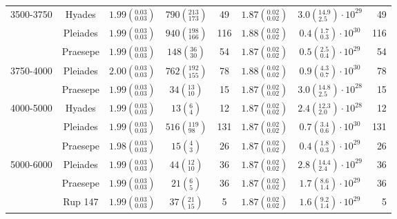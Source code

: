 \begin{tabular}{lccccccr}
3500-3750 & Hyades &  $1.99\left(^{0.03}_{0.03}\right)$ &     $790\left(^{213}_{173}\right)$ &             49 &  $1.87\left(^{0.02}_{0.02}\right)$ &  $3.0\left(^{14.9}_{2.5}\right)\cdot 10^{29}$ &               49 \\
          & Pleiades &  $1.99\left(^{0.03}_{0.03}\right)$ &     $940\left(^{198}_{166}\right)$ &            116 &  $1.88\left(^{0.02}_{0.02}\right)$ &   $0.4\left(^{1.7}_{0.3}\right)\cdot 10^{30}$ &              116 \\
          & Praesepe &  $1.99\left(^{0.03}_{0.03}\right)$ &       $148\left(^{36}_{30}\right)$ &             54 &  $1.87\left(^{0.02}_{0.02}\right)$ &   $0.5\left(^{2.5}_{0.4}\right)\cdot 10^{29}$ &               54 \\
3750-4000 & Pleiades &  $2.00\left(^{0.03}_{0.03}\right)$ &     $762\left(^{192}_{155}\right)$ &             78 &  $1.88\left(^{0.02}_{0.02}\right)$ &   $0.9\left(^{4.3}_{0.7}\right)\cdot 10^{30}$ &               78 \\
          & Praesepe &  $1.99\left(^{0.03}_{0.03}\right)$ &        $34\left(^{13}_{10}\right)$ &             15 &  $1.87\left(^{0.02}_{0.02}\right)$ &  $3.0\left(^{14.8}_{2.5}\right)\cdot 10^{28}$ &               15 \\
4000-5000 & Hyades &  $1.99\left(^{0.03}_{0.03}\right)$ &          $13\left(^{6}_{4}\right)$ &             12 &  $1.87\left(^{0.02}_{0.02}\right)$ &  $2.4\left(^{12.3}_{2.0}\right)\cdot 10^{28}$ &               12 \\
          & Pleiades &  $1.99\left(^{0.03}_{0.03}\right)$ &      $516\left(^{119}_{98}\right)$ &            131 &  $1.87\left(^{0.02}_{0.02}\right)$ &   $0.7\left(^{3.4}_{0.6}\right)\cdot 10^{30}$ &              131 \\
          & Praesepe &  $1.98\left(^{0.03}_{0.03}\right)$ &          $15\left(^{4}_{3}\right)$ &             26 &  $1.87\left(^{0.02}_{0.02}\right)$ &   $0.4\left(^{1.8}_{0.3}\right)\cdot 10^{29}$ &               26 \\
5000-6000 & Pleiades &  $1.99\left(^{0.03}_{0.03}\right)$ &        $44\left(^{12}_{10}\right)$ &             36 &  $1.87\left(^{0.02}_{0.02}\right)$ &  $2.8\left(^{14.4}_{2.4}\right)\cdot 10^{29}$ &               36 \\
          & Praesepe &  $1.99\left(^{0.03}_{0.03}\right)$ &          $21\left(^{6}_{5}\right)$ &             36 &  $1.87\left(^{0.02}_{0.02}\right)$ &   $1.7\left(^{8.6}_{1.4}\right)\cdot 10^{29}$ &               36 \\
          & Rup 147 &  $1.99\left(^{0.03}_{0.03}\right)$ &        $37\left(^{21}_{15}\right)$ &              5 &  $1.87\left(^{0.02}_{0.02}\right)$ &   $1.6\left(^{9.2}_{1.4}\right)\cdot 10^{29}$ &                5 \\
\hline

\end{tabular}
